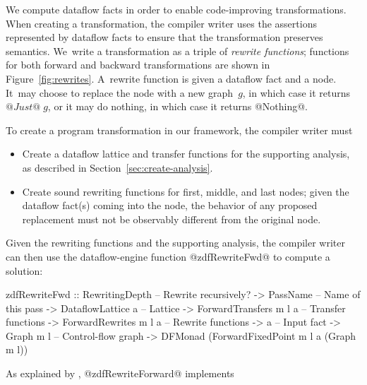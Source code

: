 \documentclass[blockstyle,preprint,nocopyrightspace]{sigplanconf}
\newcommand\secref[1]{Section~\ref{sec:#1}}
\newcommand\figref[1]{Figure~\ref{fig:#1}}
\begin{document}
We compute dataflow facts in order to enable code-improving
transformations.
When creating a transformation, the compiler writer uses
the assertions represented by dataflow facts to ensure that the
transformation preserves semantics.
We~write a transformation as a triple of
\emph{rewrite functions};
functions for both forward and backward transformations are shown in
\figref{rewrites}. 
%
A~rewrite function is given a dataflow fact and a node.
It~may choose to replace the node with a new graph~$g$, in which case it
returns $@Just@\;g$, or it may do nothing, in which case it returns @Nothing@.


To create a program transformation in our framework,
the compiler writer must 
\begin{itemize}
\item
Create a dataflow lattice and transfer functions for the supporting
analysis, as described in \secref{create-analysis}. 
\item
Create sound rewriting functions for first, middle, and last nodes;
given the dataflow fact(s) coming into the node,
the behavior of 
any proposed replacement must not be observably different from the original node.
\end{itemize}
Given the rewriting functions and the supporting analysis, the
compiler writer can then use the 
dataflow-engine function @zdfRewriteFwd@ to compute a solution:
\begin{code}
  zdfRewriteFwd 
    :: RewritingDepth         -- Rewrite recursively?
    -> PassName               -- Name of this pass
    -> DataflowLattice a      -- Lattice
    -> ForwardTransfers m l a -- Transfer functions
    -> ForwardRewrites m l a  -- Rewrite functions
    -> a                      -- Input fact
    -> Graph m l              -- Control-flow graph
    -> DFMonad (ForwardFixedPoint m l a (Graph m l))
\end{code}
As explained by \citet{lerner-grove-chambers:2002}, 
@zdfRewriteForward@ implements
\end{document}
